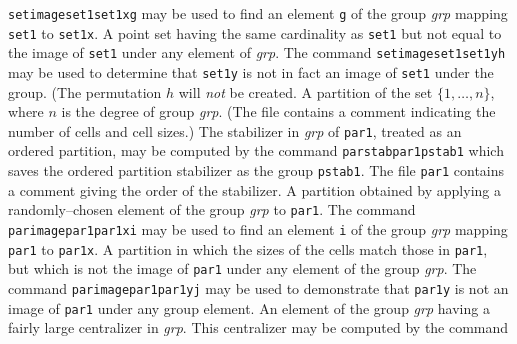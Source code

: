 {   \smallskip
   \hskip0.4in{\tt setimage\quad set1\quad set1x\quad g}
   \smallskip
          may be used to find an element {\tt g} of the group {\it grp\/} mapping
          {\tt set1} to {\tt set1x}.
   \medbreak
   \noindent{}A point set having the same cardinality
                 as {\tt set1} but not equal to the image of {\tt set1}
                 under any element of {\it grp\/}.  The command
   \smallskip
   \hskip0.4in{\tt setimage\quad set1\quad set1y\quad h}
   \smallskip
          may be used to determine that {\tt set1y} is not in fact an
          image of {\tt set1} under the group.  (The permutation $h$ will
          {\it not\/} be created.
   \medbreak
   \noindent{}A partition of the set $\{1,\ldots,n\}$, where
                 $n$ is the degree of group {\it grp}.  (The file contains
                 a comment indicating the number of cells and cell sizes.)
                 The stabilizer in {\it grp\/} of
                 {\tt par1}, treated as an ordered partition, may be computed by the
                 command
   \smallskip
   \hskip0.4in{\tt parstab\quad par1\quad pstab1}
   \smallskip
          which saves the ordered partition stabilizer as the group {\tt pstab1}.
          The file {\tt par1} contains a comment giving the order of the
          stabilizer.
   \medbreak
   \noindent{}A partition obtained by applying a
                 randomly--chosen element of the group {\it grp\/} to {\tt par1}.
                 The command
   \smallskip
   \hskip0.4in{\tt parimage\quad par1\quad par1x\quad i}
   \smallskip
          may be used to find an element {\tt i} of the group {\it grp\/} mapping
          {\tt par1} to {\tt par1x}.
   \medbreak
   \noindent{}A partition in which the sizes of the
                 cells match those in {\tt par1}, but which is not the
                 image of {\tt par1} under any element of the group {\it grp\/}.
                 The command
   \smallskip
   \hskip0.4in{\tt parimage\quad par1\quad par1y\quad j}
   \smallskip
          may be used to demonstrate that {\tt par1y} is not an image of
          {\tt par1} under any group element.
   \medbreak
   \noindent{}An element of the group {\it grp\/}
                 having a fairly
                 large centralizer in {\it grp\/}.  This centralizer may be
                 computed by the command
}
